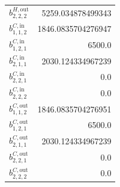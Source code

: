 \documentclass{article}%
\begin{document}
\begin{multicols*}{3}
\begin{supertabular}{lr}
	$b_{2,2,2}^{H,\text{out}}$ & 5259.034878499343 \\%
	$b_{1,1,2}^{C,\text{in}}$ & 1846.0835704276947 \\%
	$b_{1,2,1}^{C,\text{in}}$ & 6500.0 \\%
	$b_{2,1,1}^{C,\text{in}}$ & 2030.124334967239 \\%
	$b_{2,2,1}^{C,\text{in}}$ & 0.0 \\%
	$b_{2,2,2}^{C,\text{in}}$ & 0.0 \\%
	$b_{1,1,2}^{C,\text{out}}$ & 1846.0835704276951 \\%
	$b_{1,2,1}^{C,\text{out}}$ & 6500.0 \\%
	$b_{2,1,1}^{C,\text{out}}$ & 2030.124334967239 \\%
	$b_{2,2,1}^{C,\text{out}}$ & 0.0 \\%
	$b_{2,2,2}^{C,\text{out}}$ & 0.0 \\%
\end{supertabular}%
\end{multicols*}%
\end{document}
